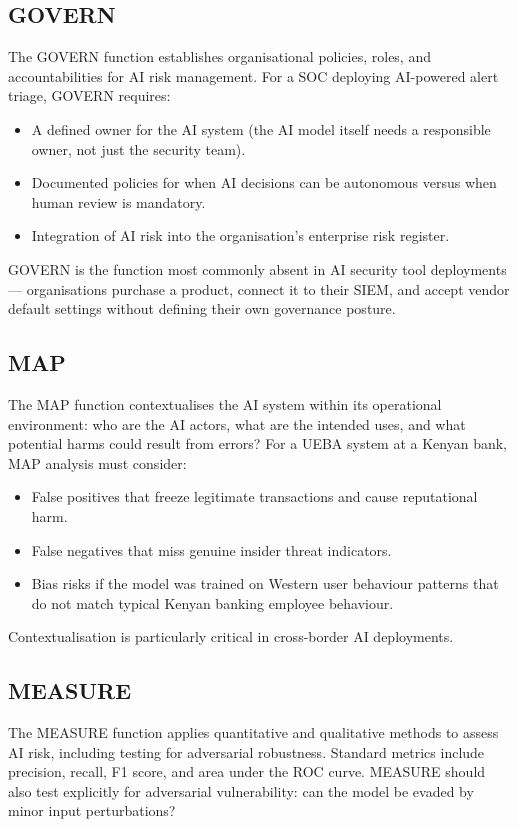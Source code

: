 \documentclass[12pt,a4paper]{article}
\begin{document}
\subsection{GOVERN}
The GOVERN function establishes organisational policies, roles, and accountabilities for AI risk management. For a SOC deploying AI-powered alert triage, GOVERN requires:
\begin{itemize}
    \item A defined owner for the AI system (the AI model itself needs a responsible owner, not just the security team).
    \item Documented policies for when AI decisions can be autonomous versus when human review is mandatory.
    \item Integration of AI risk into the organisation's enterprise risk register.
\end{itemize}
GOVERN is the function most commonly absent in AI security tool deployments --- organisations purchase a product, connect it to their SIEM, and accept vendor default settings without defining their own governance posture.

\subsection{MAP}
The MAP function contextualises the AI system within its operational environment: who are the AI actors, what are the intended uses, and what potential harms could result from errors? For a UEBA system at a Kenyan bank, MAP analysis must consider:
\begin{itemize}
    \item False positives that freeze legitimate transactions and cause reputational harm.
    \item False negatives that miss genuine insider threat indicators.
    \item Bias risks if the model was trained on Western user behaviour patterns that do not match typical Kenyan banking employee behaviour.
\end{itemize}
Contextualisation is particularly critical in cross-border AI deployments.

\subsection{MEASURE}
The MEASURE function applies quantitative and qualitative methods to assess AI risk, including testing for adversarial robustness. Standard metrics include precision, recall, F1 score, and area under the ROC curve. MEASURE should also test explicitly for adversarial vulnerability: can the model be evaded by minor input perturbations?
\end{document}

